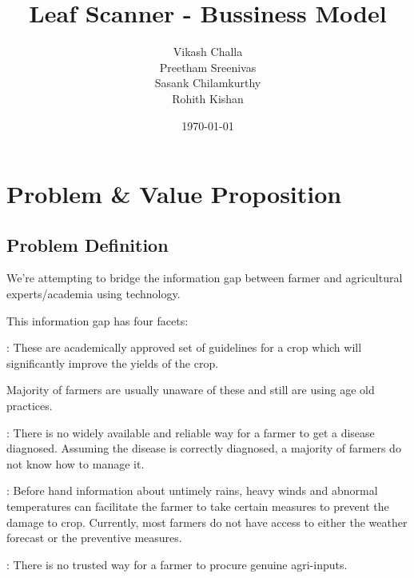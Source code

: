 \documentclass[a4paper]{article}
\begin{document}
\title{Leaf Scanner - Bussiness Model}
\author{Vikash Challa\\Preetham Sreenivas\\Sasank Chilamkurthy\\Rohith Kishan}
\date{\today}
\maketitle

\section{Problem \& Value Proposition}
\subsection{Problem Definition}
We're attempting to bridge the information gap between farmer and agricultural experts/academia using technology.


This information gap has four facets:

\begin{description}[noitemsep,topsep=0pt]
\item[Good agricultural practices]: These are academically approved set of guidelines for a crop  which will significantly improve the yields of the crop. 

Majority of farmers are usually unaware of these and still are using age old practices.
\item[Disease diagnosis \& management]: There is no widely available and reliable way for a farmer to get a disease diagnosed. 
Assuming the disease is correctly diagnosed, a majority of farmers do not know how to manage it.

\item[Preventive measures based on weather forecast]: Before hand information about untimely rains, heavy winds and abnormal temperatures can facilitate the farmer to take certain measures to prevent the damage to crop. Currently, most farmers do not have access to either the weather forecast or the preventive measures.

\item[Genuine Products]: There is no trusted way for a farmer to procure genuine agri-inputs.
\end{description}
\end{document}
